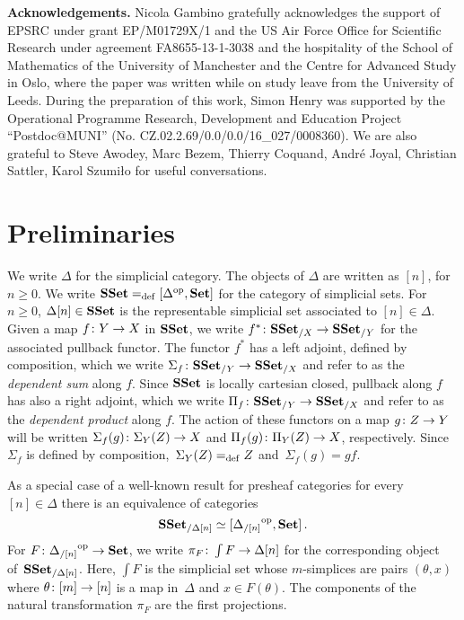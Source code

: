 \documentclass[reqno,10pt,a4paper,oneside,draft]{amsart}
\begin{document}
\smallskip

\noindent 
\textbf{Acknowledgements.} Nicola Gambino gratefully acknowledges the support of
EPSRC under grant EP/M01729X/1 and the US Air Force Office for Scientific Research under 
agreement FA8655-13-1-3038 and the hospitality of the 
School of Mathematics of the University of Manchester and the Centre for Advanced Study in Oslo,
where the paper was written while on study leave from the University of Leeds. During the preparation of this work, Simon Henry was supported by the Operational Programme Research, Development and Education Project ``Postdoc@MUNI'' (No. CZ.02.2.69/0.0/0.0/16\_027/0008360). We are also grateful to Steve Awodey, Marc Bezem, Thierry Coquand, Andr\'e Joyal, Christian Sattler, Karol Szumi{\l}o  for useful conversations. 






\section{Preliminaries} 
\label{sec:preliminaries}




We write $\Delta$ for the simplicial category. The objects of $\Delta$ are written as $[n]$, for $n \geq 0$.
We write $\mathbf{SSet} =_{\operatorname{def}} [\Delta^{\operatorname{op}}, \mathbf{Set}]$ for the category of simplicial sets. For $n \geq 0$, $\Delta[n] \in \mathbf{SSet}$ is the representable simplicial set associated to $[n] \in \Delta$. Given a map $f \colon Y \to X$ in $\mathbf{SSet}$, we write $f^* \colon \mathbf{SSet}_{/X} \to \mathbf{SSet}_{/Y}$
for the associated pullback functor. The functor $f^*$ has a left adjoint, defined
by composition, which we write $\Sigma_{f} \colon \mathbf{SSet}_{/Y} \to \mathbf{SSet}_{/X}$ and refer
to as the \emph{dependent sum} along $f$. Since $\mathbf{SSet}$ is locally cartesian closed, pullback
along $f$ has also a right adjoint, which we write 
$\Pi_f \colon \mathbf{SSet}_{/Y} \to \mathbf{SSet}_{/X}$ and refer to as the \emph{dependent
product}  along $f$. The action of these functors on a
map $g \colon Z \to Y$ will be written $\Sigma_f(g) \colon \Sigma_Y(Z) \to X$ and 
$\Pi_f(g) \colon \Pi_Y(Z) \to X$, respectively. Since  $\Sigma_f$ is defined by composition,~$\Sigma_Y(Z) =_{\operatorname{def}} Z$ and~$\Sigma_f(g) = g f $. 

As a special case of a well-known result for presheaf 
categories for every~$[n] \in \Delta$ there is an equivalence of categories
\begin{equation}
\label{equ:psh-slice-sset}
\mathbf{SSet}_{/\Delta[n]} \simeq  [ {\Delta_{/[n]}}^{\operatorname{op}}, \mathbf{Set}]   \, .
\end{equation}
For $F \colon {\Delta_{/[n]}}^{\operatorname{op}} \to \mathbf{Set}$, we write $\pi_F \colon \int F \to \Delta[n]$
for the corresponding object of~$\mathbf{SSet}_{/ \Delta[n]}$. Here, $\int F$ is the
simplicial set whose $m$-simplices are pairs $(\theta, x)$ where $\theta \colon [m] \to [n]$
is a map in~$\Delta$ and $x \in F(\theta)$. The components of the natural
transformation $\pi_F$ are the first projections.
\end{document}
